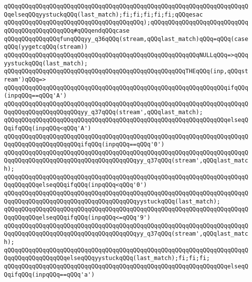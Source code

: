 \verb|qQQqqQQqqQQqqQQqqQQqqQQqqQQqqQQqqQQqqQQqqQQqqQQqqQQqqQQqqQQqqQQqqQQqqQQqelseqQQqyystuckqQQq(last_match);fi;fi;fi;fi;fi;qQQqesac|\newline
\verb|qQQqqQQqqQQqqQQqqQQqqQQqqQQqqQQqqQQqqQQq);qQQqqQQqqQQqqQQqqQQqqQQqqQQqqQQqqQQqqQQqqQQqqQQq#qQQqendqQQqcase|\newline
\verb|qQQqqQQqqQQqqQQqfunqQQqyy_q36qQQq(stream,qQQqlast_match)qQQq=qQQq(caseqQQq(yygetcqQQq(stream))|\newline
\verb|qQQqqQQqqQQqqQQqqQQqqQQqqQQqqQQqqQQqqQQqqQQqqQQqqQQqqQQqNULLqQQq=>qQQqyystuckqQQq(last_match);|\newline
\verb|qQQqqQQqqQQqqQQqqQQqqQQqqQQqqQQqqQQqqQQqqQQqqQQqqQQqTHEqQQq(inp,qQQqstream')qQQq=>|\newline
\verb|qQQqqQQqqQQqqQQqqQQqqQQqqQQqqQQqqQQqqQQqqQQqqQQqqQQqqQQqqQQqqQQqifqQQq(inpqQQq==qQQq'A')|\newline
\verb|qQQqqQQqqQQqqQQqqQQqqQQqqQQqqQQqqQQqqQQqqQQqqQQqqQQqqQQqqQQqqQQqqQQqqQQqqQQqqQQqqQQqqQQqqQQqyy_q37qQQq(stream',qQQqlast_match);|\newline
\verb|qQQqqQQqqQQqqQQqqQQqqQQqqQQqqQQqqQQqqQQqqQQqqQQqqQQqqQQqqQQqqQQqelseqQQqifqQQq(inpqQQq<qQQq'A')|\newline
\verb|qQQqqQQqqQQqqQQqqQQqqQQqqQQqqQQqqQQqqQQqqQQqqQQqqQQqqQQqqQQqqQQqqQQqqQQqqQQqqQQqqQQqqQQqqQQqifqQQq(inpqQQq==qQQq'0')|\newline
\verb|qQQqqQQqqQQqqQQqqQQqqQQqqQQqqQQqqQQqqQQqqQQqqQQqqQQqqQQqqQQqqQQqqQQqqQQqqQQqqQQqqQQqqQQqqQQqqQQqqQQqqQQqqQQqyy_q37qQQq(stream',qQQqlast_match);|\newline
\verb|qQQqqQQqqQQqqQQqqQQqqQQqqQQqqQQqqQQqqQQqqQQqqQQqqQQqqQQqqQQqqQQqqQQqqQQqqQQqqQQqelseqQQqifqQQq(inpqQQq<qQQq'0')|\newline
\verb|qQQqqQQqqQQqqQQqqQQqqQQqqQQqqQQqqQQqqQQqqQQqqQQqqQQqqQQqqQQqqQQqqQQqqQQqqQQqqQQqqQQqqQQqqQQqqQQqqQQqqQQqqQQqyystuckqQQq(last_match);|\newline
\verb|qQQqqQQqqQQqqQQqqQQqqQQqqQQqqQQqqQQqqQQqqQQqqQQqqQQqqQQqqQQqqQQqqQQqqQQqqQQqqQQqelseqQQqifqQQq(inpqQQq<=qQQq'9')|\newline
\verb|qQQqqQQqqQQqqQQqqQQqqQQqqQQqqQQqqQQqqQQqqQQqqQQqqQQqqQQqqQQqqQQqqQQqqQQqqQQqqQQqqQQqqQQqqQQqqQQqqQQqqQQqqQQqyy_q37qQQq(stream',qQQqlast_match);|\newline
\verb|qQQqqQQqqQQqqQQqqQQqqQQqqQQqqQQqqQQqqQQqqQQqqQQqqQQqqQQqqQQqqQQqqQQqqQQqqQQqqQQqqQQqqQQqelseqQQqyystuckqQQq(last_match);fi;fi;fi;|\newline
\verb|qQQqqQQqqQQqqQQqqQQqqQQqqQQqqQQqqQQqqQQqqQQqqQQqqQQqqQQqqQQqqQQqelseqQQqifqQQq(inpqQQq==qQQq'a')|\newline
